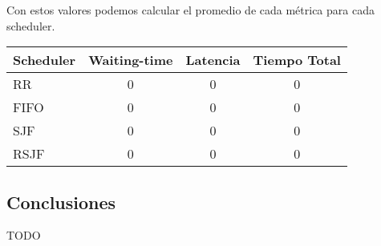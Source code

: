 Con estos valores podemos calcular el promedio de cada métrica para cada scheduler.

\begin{center}
        \begin{tabular}{| l | c | c | c |}
                \hline
    Scheduler & Waiting-time & Latencia & Tiempo Total \\
                \hline
    RR   &       0 &    0 &    0 \\
    FIFO &       0 &    0 &    0 \\
    SJF  &       0 &    0 &    0 \\
    RSJF &       0 &    0 &    0 \\
                \hline
        \end{tabular}
\end{center}

\subsection{Conclusiones}

TODO

